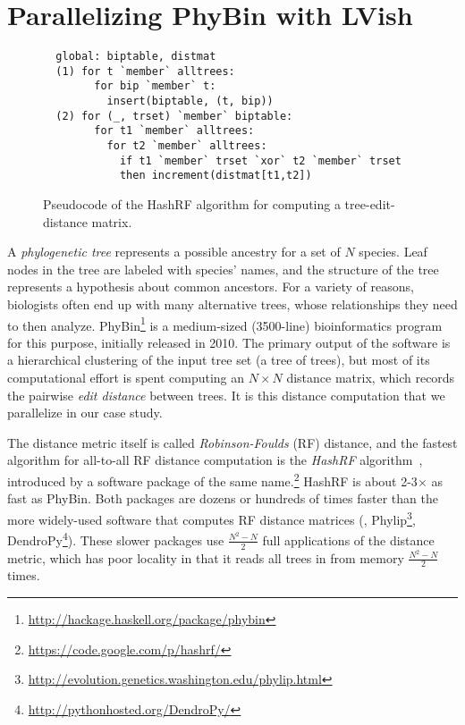 \section{Parallelizing PhyBin with LVish} \label{s:lvish-phybin}

\begin{figure}
  \centering
\begin{lstlisting}
  global: biptable, distmat
  (1) for t `member` alltrees:
        for bip `member` t:
          insert(biptable, (t, bip))
  (2) for (_, trset) `member` biptable: 
        for t1 `member` alltrees:
          for t2 `member` alltrees:
            if t1 `member` trset `xor` t2 `member` trset
            then increment(distmat[t1,t2])
\end{lstlisting}  
  \caption{Pseudocode of the HashRF algorithm for computing a tree-edit-distance matrix.}
  \label{f:hashrf-alg}
\end{figure}


A {\em phylogenetic tree} represents a possible ancestry for a set of $N$ species.
Leaf nodes in the tree are labeled with species' names, and the structure of the
tree represents a hypothesis about common ancestors. For a variety of reasons, biologists often end up
with many alternative trees, whose relationships they need to then analyze.
PhyBin\footnote{\url{http://hackage.haskell.org/package/phybin}} is a medium-sized (3500-line)
bioinformatics program for this purpose, initially released in 2010.
%
The primary output of the 
software is a hierarchical clustering of the input tree set (a tree
of trees), but most of its computational effort is spent computing an
$N{\times}N$ 
distance matrix, which records the pairwise 
{\em edit distance} between trees.
It is this distance computation that we parallelize in our case study.

The distance metric itself is called {\em Robinson-Foulds} (RF) distance, and
the fastest algorithm for all-to-all RF distance computation is the {\em HashRF}
algorithm~\cite{hashrf}, introduced by a software package of the same name.\footnote{\url{https://code.google.com/p/hashrf/}}  HashRF is about
2-3$\times$ as fast as PhyBin.  Both packages are dozens or hundreds of times faster
than the more widely-used software that computes RF distance matrices (\eg{}, Phylip\footnote{\url{http://evolution.genetics.washington.edu/phylip.html}}, DendroPy\footnote{\url{http://pythonhosted.org/DendroPy/}}).  These
slower packages use $\frac{N^2-N}{2}$ full applications of the distance metric, which has poor
locality in that it reads all trees in from memory $\frac{N^2-N}{2}$ times.
%

